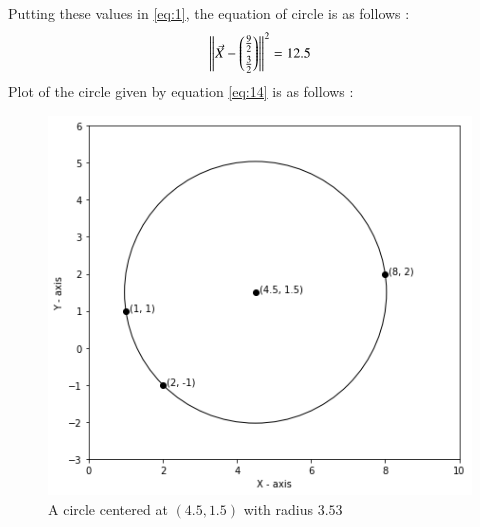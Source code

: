 \documentclass[journal,12pt,twocolumn]{IEEEtran}
\begin{document}
Putting these values in \eqref{eq:1}, the equation of circle is as follows : 
\begin{align}
\left\lVert\Vec{X}-\begin{pmatrix}\frac{9}{2}\\[0.1cm]\frac{3}{2}\end{pmatrix}\right\rVert^2=12.5\label{eq:14}
\end{align}
Plot of the circle given by equation \eqref{eq:14} is as follows :
\begin{figure}[h]
\centering
    \includegraphics[width=\columnwidth]{circle2.png}
    \caption{A circle centered at $(4.5, 1.5)$ with radius $3.53$}
    \label{circle}
\end{figure}
\end{document}

